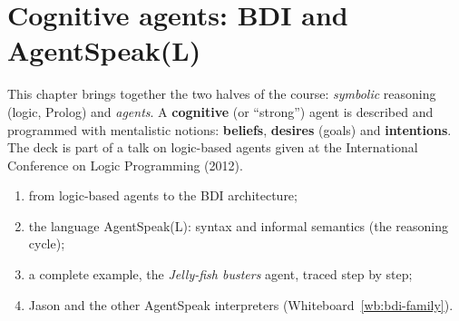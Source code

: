 \section{Cognitive agents: BDI and AgentSpeak(L)}
\label{sec:bdi-agentspeak}

This chapter brings together the two halves of the course: \emph{symbolic} reasoning (logic,
Prolog) and \emph{agents}. A \textbf{cognitive} (or ``strong'') agent is described and
programmed with mentalistic notions: \textbf{beliefs}, \textbf{desires} (goals) and
\textbf{intentions}. The deck is part of a talk on logic-based agents given at the
International Conference on Logic Programming (2012).
\begin{enumerate}[nosep]
  \item from logic-based agents to the BDI architecture;
  \item the language AgentSpeak(L): syntax and informal semantics (the reasoning cycle);
  \item a complete example, the \emph{Jelly-fish busters} agent, traced step by step;
  \item Jason and the other AgentSpeak interpreters (Whiteboard~\ref{wb:bdi-family}).
\end{enumerate}






